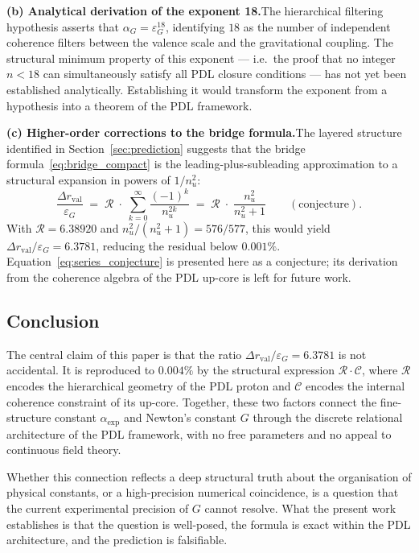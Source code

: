 \documentclass[11pt,a4paper]{article}
\begin{document}
\textbf{(b) Analytical derivation of the exponent 18.}The hierarchical filtering hypothesis \cite{Exponent_18_PDL_2026} asserts that $\alpha_G = \varepsilon_G^{18}$, identifying $18$ as the number of independent coherence filters between the valence scale and the gravitational coupling. The structural minimum property of this exponent --- i.e.\ the proof that no integer $n < 18$ can simultaneously satisfy all PDL closure conditions --- has not yet been established analytically. Establishing it would transform the exponent from a hypothesis into a theorem of the PDL framework.

\textbf{(c) Higher-order corrections to the bridge formula.}The layered structure identified in Section~\ref{sec:prediction} suggests that the bridge formula~\eqref{eq:bridge_compact} is the leading-plus-subleading approximation to a structural expansion in powers of $1/n_u^2$:
\begin{equation}
    \frac{\Delta r_{\mathrm{val}}}{\varepsilon_G}
    \;=\; \mathcal{R}\;\cdot\;\sum_{k=0}^{\infty}
          \frac{(-1)^k}{n_u^{2k}}
    \;=\; \mathcal{R}\;\cdot\;\frac{n_u^2}{n_u^2+1}
    \qquad (\text{conjecture}).
    \label{eq:series_conjecture}
\end{equation}
With $\mathcal{R} = 6.38920$ and $n_u^2/(n_u^2+1) = 576/577$, this would yield $\Delta r_{\mathrm{val}}/\varepsilon_G = 6.3781$, reducing the residual below $0.001\%$. Equation~\eqref{eq:series_conjecture} is presented here as a conjecture; its derivation from the coherence algebra of the PDL up-core is left for future work.

\subsection{Conclusion}

The central claim of this paper is that the ratio $\Delta r_{\mathrm{val}}/\varepsilon_G = 6.3781$ is not accidental. It is reproduced to $0.004\%$ by the structural expression $\mathcal{R}\cdot\mathcal{C}$, where $\mathcal{R}$ encodes the hierarchical geometry of the PDL proton and $\mathcal{C}$ encodes the internal coherence constraint of its up-core. Together, these two factors connect the fine-structure constant $\alpha_{\exp}$ and Newton's constant $G$ through the discrete relational architecture of the PDL framework, with no free parameters and no appeal to continuous field theory.

Whether this connection reflects a deep structural truth about the organisation of physical constants, or a high-precision numerical coincidence, is a question that the current experimental precision of $G$ cannot resolve. What the present work establishes is that the question is well-posed, the formula is exact within the PDL architecture, and the prediction is falsifiable.




\end{document}
